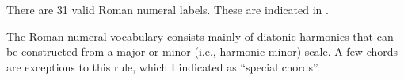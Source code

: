 
There are 31 valid Roman numeral labels. These are indicated
in .


The Roman numeral vocabulary consists mainly of diatonic
harmonies that can be constructed from a major or minor
(i.e., harmonic minor) scale. A few chords are exceptions to
this rule, which I indicated as ``special chords''.
